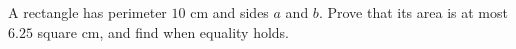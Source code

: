 A rectangle has perimeter $10$ cm and sides $a$ and $b$. Prove that its area is at most $6.25$ square cm, and find when equality holds.
